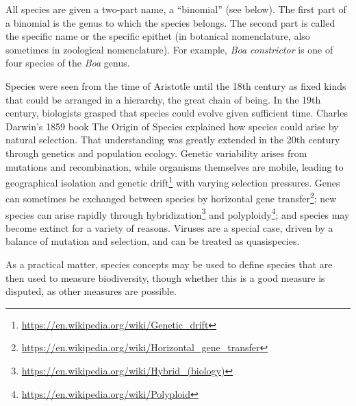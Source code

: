 \documentclass[]{book}
\let\rmarkdownfootnote\footnote%
\def\footnote{\protect\rmarkdownfootnote}
\renewcommand{\href}[2]{#2\footnote{\url{#1}}}
\begin{document}
All species are given a two-part name, a ``binomial'' (see below). The first part of a binomial is the genus to which the species belongs. The second part is called the specific name or the specific epithet (in botanical nomenclature, also sometimes in zoological nomenclature). For example, \emph{Boa constrictor} is one of four species of the \emph{Boa} genus.

Species were seen from the time of Aristotle until the 18th century as fixed kinds that could be arranged in a hierarchy, the great chain of being. In the 19th century, biologists grasped that species could evolve given sufficient time. Charles Darwin's 1859 book The Origin of Species explained how species could arise by natural selection. That understanding was greatly extended in the 20th century through genetics and population ecology. Genetic variability arises from mutations and recombination, while organisms themselves are mobile, leading to geographical isolation and \href{https://en.wikipedia.org/wiki/Genetic_drift}{genetic drift} with varying selection pressures. Genes can sometimes be exchanged between species by \href{https://en.wikipedia.org/wiki/Horizontal_gene_transfer}{horizontal gene transfer}; new species can arise rapidly through \href{https://en.wikipedia.org/wiki/Hybrid_(biology)}{hybridization} and \href{https://en.wikipedia.org/wiki/Polyploid}{polyploidy}; and species may become extinct for a variety of reasons. Viruses are a special case, driven by a balance of mutation and selection, and can be treated as quasispecies.

As a practical matter, species concepts may be used to define species that are then used to measure biodiversity, though whether this is a good measure is disputed, as other measures are possible.
\end{document}
